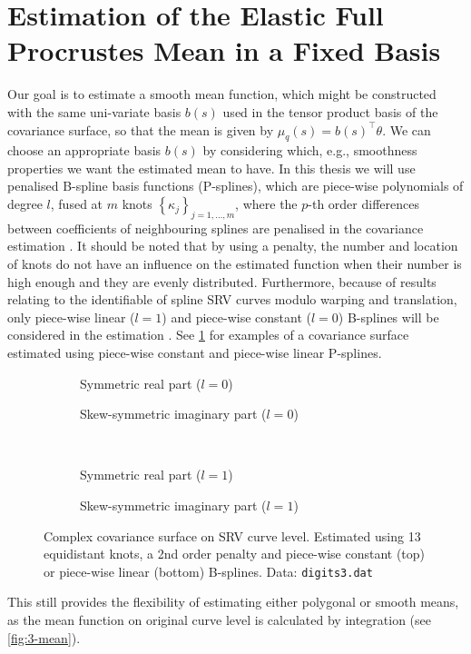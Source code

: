 \section{Estimation of the Elastic Full Procrustes Mean in a Fixed Basis}
\label{sec:3-mean}
Our goal is to estimate a smooth mean function, which might be constructed with the same uni-variate basis $b(s)$ used in the tensor product basis of the covariance surface, so that the mean is given by $\mu_q(s) = b(s)^\top \theta$.
We can choose an appropriate basis $b(s)$ by considering which, e.g., smoothness properties we want the estimated mean to have.
In this thesis we will use penalised B-spline basis functions (P-splines), which are piece-wise polynomials of degree $l$, fused at $m$ knots $\left\{\kappa_j\right\}_{j=1,\dots,m}$, where the $p$-th order differences between coefficients of neighbouring splines are penalised in the covariance estimation \parencite[see][Chap.~8.1]{FahrmeierEtAl2013}.
It should be noted that by using a penalty, the number and location of knots do not have an influence on the estimated function when their number is high enough and they are evenly distributed.
Furthermore, because of results relating to the identifiable of spline SRV curves modulo warping and translation, only piece-wise linear ($l = 1$) and piece-wise constant ($l = 0$) B-splines will be considered in the estimation \parencite[see][]{Steyer2021}.
See \cref{fig:3-cov} for examples of a covariance surface estimated using piece-wise constant and piece-wise linear P-splines.
\begin{figure}[t]
  \centering
  \begin{subfigure}{.48\textwidth}
    \centering
    \caption{Symmetric real part ($l = 0$)}
  \end{subfigure}\hfill%
  \begin{subfigure}{.48\textwidth}
    \centering
    \caption{Skew-symmetric imaginary part ($l = 0$)}
  \end{subfigure}\vspace{0.66em}\\
  \begin{subfigure}{.48\textwidth}
    \centering
    \caption{Symmetric real part ($l = 1$)}
  \end{subfigure}\hfill%
  \begin{subfigure}{.48\textwidth}
    \centering
    \caption{Skew-symmetric imaginary part ($l =1$)}
  \end{subfigure}
  \caption{Complex covariance surface on SRV curve level. Estimated using 13 equidistant knots, a 2nd order penalty and piece-wise constant (top) or piece-wise linear (bottom) B-splines. Data: \texttt{digits3.dat}}
  \label{fig:3-cov}
\end{figure}
This still provides the flexibility of estimating either polygonal or smooth means, as the mean function on original curve level is calculated by integration (see \cref{fig:3-mean}). 

